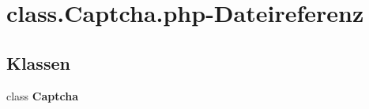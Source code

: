 \section{class.Captcha.php-Dateireferenz}
\label{class_8Captcha_8php}
\subsection*{Klassen}
\begin{CompactItemize}
\item 
class {\bf Captcha}
\end{CompactItemize}
